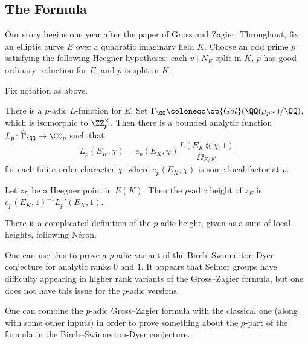 \documentclass{article}
\begin{document}
\subsection{The Formula}
Our story begins one year after the paper of Gross and Zagier. Throughout, fix an elliptic curve $E$ over a quadratic imaginary field $K$. Choose an odd prime $p$ satisfying the following Heegner hypotheses: each $v\mid N_E$ split in $K$, $p$ has good ordinary reduction for $E$, and $p$ is split in $K$.
\begin{theorem}
	Fix notation as above.
	\begin{listalph}
		\item There is a $p$-adic $L$-function for $E$. Set $\Gamma_\QQ\coloneqq\op{Gal}(\QQ(\mu_{p^\infty})/\QQ)$, which is isomorphic to $\ZZ_p^\times$. Then there is a bounded analytic function $L_p\colon\widehat{\Gamma}_\QQ\to\CC_p$ such that
		\[L_p(E_K,\chi)=e_p(E_K,\chi)\frac{L(E_K\otimes\chi,1)}{\Omega_{E/K}}\]
		for each finite-order character $\chi$, where $e_p(E_K,\chi)$ is some local factor at $p$.
		\item Let $z_E$ be a Heegner point in $E(K)$. Then the $p$-adic height of $z_E$ is $e_p(E_K,1)^{-1}L_p'(E_K,1)$.
	\end{listalph}
\end{theorem}
\begin{remark}
	There is a complicated definition of the $p$-adic height, given as a sum of local heights, following N\'eron.
\end{remark}
\begin{remark}
	One can use this to prove a $p$-adic variant of the Birch--Swinnerton-Dyer conjecture for analytic ranks $0$ and $1$. It appears that Selmer groups have difficulty appearing in higher rank variants of the Gross--Zagier formula, but one does not have this issue for the $p$-adic versions.
\end{remark}
\begin{remark}
	One can combine the $p$-adic Gross--Zagier formula with the classical one (along with some other inputs) in order to prove something about the $p$-part of the formula in the Birch--Swinnerton-Dyer conjecture.
\end{remark}
\end{document}
